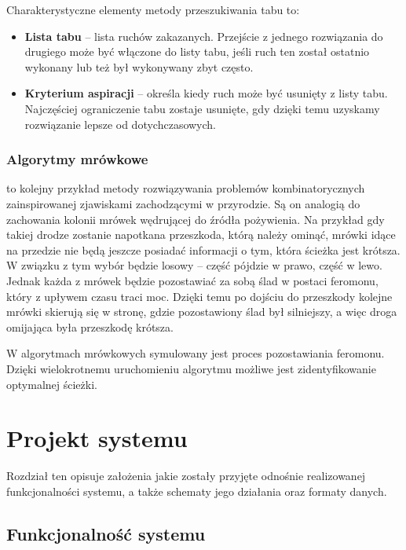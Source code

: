 Charakterystyczne elementy metody przeszukiwania tabu to:
\begin{itemize}
	\item \textbf{Lista tabu} -- lista ruchów zakazanych. Przejście z jednego rozwiązania do drugiego może być włączone do listy tabu, jeśli ruch ten został 
	ostatnio wykonany lub też był wykonywany zbyt często.
	\item \textbf{Kryterium aspiracji} -- określa kiedy ruch może być usunięty z listy tabu. Najczęściej ograniczenie tabu zostaje usunięte, gdy dzięki 
	temu uzyskamy rozwiązanie lepsze od dotychczasowych.
\end{itemize}

\subsection{Algorytmy mrówkowe}

 to kolejny przykład metody rozwiązywania problemów kombinatorycznych zainspirowanej zjawiskami zachodzącymi w przyrodzie. 
Są on analogią do zachowania kolonii mrówek wędrującej do źródła pożywienia. Na przykład gdy takiej drodze zostanie napotkana przeszkoda, którą 
należy ominąć, mrówki idące na przedzie nie będą jeszcze posiadać informacji o tym, która ścieżka jest krótsza. W związku z tym wybór będzie losowy -- 
część pójdzie w prawo, część w lewo. Jednak każda z mrówek będzie pozostawiać za sobą ślad w postaci feromonu, który z upływem czasu traci moc. 
Dzięki temu po dojściu do przeszkody kolejne mrówki skierują się w stronę, gdzie pozostawiony ślad był silniejszy, a więc droga omijająca 
była przeszkodę krótsza.

W algorytmach mrówkowych symulowany jest proces pozostawiania feromonu. Dzięki wielokrotnemu uruchomieniu algorytmu możliwe jest zidentyfikowanie 
optymalnej ścieżki.


\chapter{Projekt systemu}

Rozdział ten opisuje założenia jakie zostały przyjęte odnośnie realizowanej funkcjonalności systemu, a także schematy jego działania oraz 
formaty danych.

\section{Funkcjonalność systemu}

